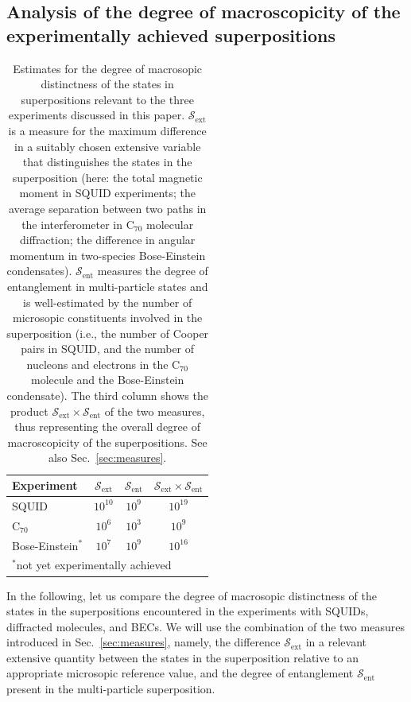 \documentclass[12pt,aps,floatfix,amsmath,amssymb,showpacs,nofootinbib]{revtex4-2}
\begin{document}
\subsection{Analysis of the degree of
  macroscopicity of the experimentally achieved superpositions} \label{sec:scaling}

\begin{table}
\begin{center}
\begin{tabular}{lccc}
Experiment & $\mathcal{S}_\text{ext}$ & $\mathcal{S}_\text{ent}$ &
$\mathcal{S}_\text{ext} \times \mathcal{S}_\text{ent}$ \\ \hline
SQUID & $10^{10}$ & $10^9$ & $10^{19}$ \\
C$_{70}$ &  $10^6$ & $10^3$ & $10^9$ \\
Bose-Einstein$^*$ & $10^7$ & $10^9$ & $10^{16}$ \\ \hline
\multicolumn{4}{l}{$^*$not yet experimentally achieved}
 \\ 
\end{tabular}
\end{center}
\caption[Estimates for the degree of macrosopic
  distinctness of the states in superpositions]{
  Estimates for the degree of macrosopic 
  distinctness of the states in superpositions relevant to the three
  experiments discussed in this paper. $\mathcal{S}_\text{ext}$
  is a measure for the maximum difference in a suitably chosen
  extensive variable that distinguishes the states in the
  superposition (here: the total magnetic moment in SQUID experiments; the
  average separation between two paths in the interferometer in
  C$_{70}$ molecular diffraction; the difference in angular
  momentum in two-species Bose-Einstein
  condensates). $\mathcal{S}_\text{ent}$ measures the degree of
  entanglement in multi-particle states and is well-estimated by the
  number of microsopic constituents involved in the superposition
  (i.e., the  number of Cooper pairs in SQUID, and the number of nucleons and
  electrons in the C$_{70}$ molecule and the Bose-Einstein
  condensate). The third column shows the product
  $\mathcal{S}_\text{ext} \times \mathcal{S}_\text{ent}$ of the two
  measures, thus representing the overall degree of macroscopicity of the
  superpositions. See also Sec.~\ref{sec:measures}.} \label{tab:degrees}
\end{table}

In the following, let us compare the degree of macrosopic distinctness
of the states in the superpositions encountered in the experiments
with SQUIDs, diffracted molecules, and BECs.  We will use the
combination of the two measures introduced in Sec.~\ref{sec:measures},
namely, the difference $\mathcal{S}_\text{ext}$ in a relevant
extensive quantity between the states in the superposition relative to
an appropriate microsopic reference value, and the degree of
entanglement $\mathcal{S}_\text{ent}$ present in the multi-particle
superposition.
\end{document}

